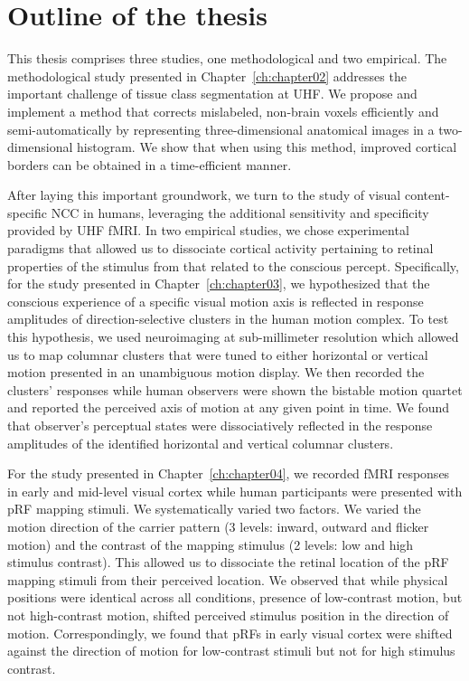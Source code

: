 \section{Outline of the thesis}
This thesis comprises three studies, one methodological and two empirical. The methodological study presented in Chapter~\ref{ch:chapter02} addresses the important challenge of tissue class segmentation at UHF. We propose and implement a method that corrects mislabeled, non-brain voxels efficiently and semi-automatically by representing three-dimensional anatomical images in a two-dimensional histogram. We show that when using this method, improved cortical borders can be obtained in a time-efficient manner.

After laying this important groundwork, we turn to the study of visual content-specific NCC in humans, leveraging the additional sensitivity and specificity provided by UHF fMRI. In two empirical studies, we chose experimental paradigms that allowed us to dissociate cortical activity pertaining to retinal properties of the stimulus from that related to the conscious percept. Specifically, for the study presented in Chapter~\ref{ch:chapter03}, we hypothesized that the conscious experience of a specific visual motion axis is reflected in response amplitudes of direction-selective clusters in the human motion complex. To test this hypothesis, we used neuroimaging at sub-millimeter resolution which allowed us to map columnar clusters that were tuned to either horizontal or vertical motion presented in an unambiguous motion display. We then recorded the clusters' responses while human observers were shown the bistable motion quartet and reported the perceived axis of motion at any given point in time. We found that observer's perceptual states were dissociatively reflected in the response amplitudes of the identified horizontal and vertical columnar clusters.

For the study presented in Chapter~\ref{ch:chapter04}, we recorded fMRI responses in early and mid-level visual cortex while human participants were presented with pRF mapping stimuli. We systematically varied two factors. We varied the motion direction of the carrier pattern (3 levels: inward, outward and flicker motion) and the contrast of the mapping stimulus (2 levels: low and high stimulus contrast). This allowed us to dissociate the retinal location of the pRF mapping stimuli from their perceived location. We observed that while physical positions were identical across all conditions, presence of low-contrast motion, but not high-contrast motion, shifted perceived stimulus position in the direction of motion. Correspondingly, we found that pRFs in early visual cortex were shifted against the direction of motion for low-contrast stimuli but not for high stimulus contrast.

\clearpage
\printbibliography[heading=subbibnumbered, title={References}]